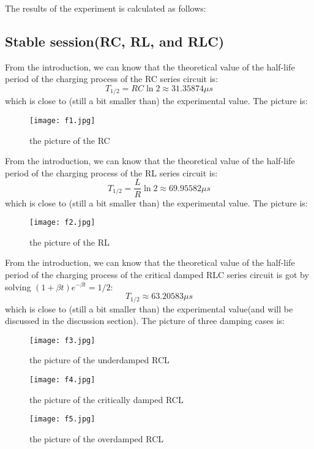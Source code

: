\documentclass[12pt, a4paper, oneside]{article}
\begin{document}
The results of the experiment is calculated as follows:

\subsection{Stable session(RC, RL, and RLC)}
\label{sec_results}

From the introduction, we can know that the theoretical value of the half-life period of the charging process of the RC series circuit is: 
\[T_{1/2} = RC\ln{2} \approx 31.35874 \mu s\]
which is close to (still a bit smaller than) the experimental value. The picture is:

\begin{figure}[htbp!]
  \centering
  \texttt{[image: f1.jpg]}
  \caption{the picture of the RC}
\end{figure}

From the introduction, we can know that the theoretical value of the half-life period of the charging process of the RL series circuit is: 
\[T_{1/2} = \frac{L}{R}\ln{2} \approx 69.95582 \mu s\]
which is close to (still a bit smaller than) the experimental value. The picture is:

\begin{figure}[htbp!]
  \centering
  \texttt{[image: f2.jpg]}
  \caption{the picture of the RL}
\end{figure}

From the introduction, we can know that the theoretical value of the half-life period of the charging process of the critical damped RLC series circuit is got by solving $(1+\beta t)e^{-\beta t}=1/2$:
\[T_{1/2} \approx 63.20583 \mu s\]
which is close to (still a bit smaller than) the experimental value(and will be discussed in the discussion section). The picture of three damping cases is:

\begin{figure}[htbp!]
  \centering
  \texttt{[image: f3.jpg]}
  \caption{the picture of the underdamped RCL}
\end{figure}

\begin{figure}[htbp!]
  \centering
  \texttt{[image: f4.jpg]}
  \caption{the picture of the critically damped RCL}
\end{figure}

\begin{figure}[htbp!]
  \centering
  \texttt{[image: f5.jpg]}
  \caption{the picture of the overdamped RCL} 
\end{figure}
\end{document}
